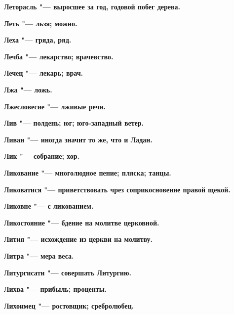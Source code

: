 \begin{multicols}{2}
\bfseries Леторасль\normalfont{} "--- выросшее за год, годовой побег дерева. 




\bfseries Леть\normalfont{} "--- льзя; можно. 




\bfseries Леха\normalfont{} "--- гряда, ряд. 




\bfseries Лечба\normalfont{} "--- лекарство; врачевство. 




\bfseries Лечец\normalfont{} "--- лекарь; врач. 




\bfseries Лжа\normalfont{} "--- ложь. 




\bfseries Лжесловесие\normalfont{} "--- лживые речи. 




\bfseries Лив\normalfont{} "--- полдень; юг; юго-западный ветер. 




\bfseries Ливан\normalfont{} "--- иногда значит то же, что и Ладан. 




\bfseries Лик\normalfont{} "--- собрание; хор. 




\bfseries Ликование\normalfont{} "--- многолюдное пение; пляска; танцы. 




\bfseries Ликоватися\normalfont{} "--- приветствовать чрез соприкосновение правой щекой. 




\bfseries Ликовне\normalfont{} "--- с ликованием. 




\bfseries Ликостояние\normalfont{} "--- бдение на молитве церковной. 




\bfseries Лития\normalfont{} "--- исхождение из церкви на молитву. 




\bfseries Литра\normalfont{} "--- мера веса. 




\bfseries Литургисати\normalfont{} "--- совершать Литургию. 




\bfseries Лихва\normalfont{} "--- прибыль; проценты. 




\bfseries Лихоимец\normalfont{} "--- ростовщик; сребролюбец. 





\end{multicols}
